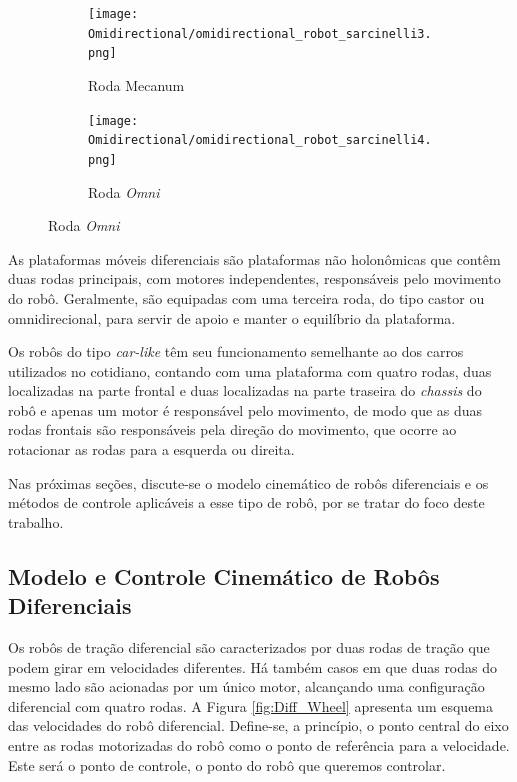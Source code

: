 \begin{figure}[htb]
    \caption{Rodas de Robôs Omnidirecionais}
    \centering    
    \begin{subfigure}[b]{0.2\textwidth}
        \texttt{[image: Omidirectional/omidirectional\_robot\_sarcinelli3.png]}
        \caption{Roda Mecanum}
    \end{subfigure}
    \hspace{0.1\textwidth}
    \begin{subfigure}[b]{0.2\textwidth}
        \texttt{[image: Omidirectional/omidirectional\_robot\_sarcinelli4.png]}
        \caption{Roda \textit{Omni}}
    \end{subfigure}
    \label{fig:rodas_omnidirecionais}
\end{figure}


As plataformas móveis diferenciais são plataformas não holonômicas que contêm duas rodas principais, com motores independentes, responsáveis pelo movimento do robô. Geralmente, são equipadas com uma terceira roda, do tipo castor ou omnidirecional, para servir de apoio e manter o equilíbrio da plataforma.

Os robôs do tipo \textit{car-like} têm seu funcionamento semelhante ao dos carros utilizados no cotidiano, contando com uma plataforma com quatro rodas, duas localizadas na parte frontal e duas localizadas na parte traseira do \textit{chassis} do robô e apenas um motor é responsável pelo movimento, de modo que as duas rodas frontais são responsáveis pela direção do movimento, que ocorre ao rotacionar as rodas para a esquerda ou direita.

Nas próximas seções, discute-se o modelo cinemático de robôs diferenciais e os métodos de controle aplicáveis a esse tipo de robô, por se tratar do foco deste trabalho.


    \subsection{Modelo e Controle Cinemático de Robôs Diferenciais}
    \label{sec:Modelo_Robos_Diferenciais}
    
    Os robôs de tração diferencial são caracterizados por duas rodas de tração que podem girar em velocidades diferentes. Há também casos em que duas rodas do mesmo lado são acionadas por um único motor, alcançando uma configuração diferencial com quatro rodas. A Figura \ref{fig:Diff_Wheel} apresenta um esquema das velocidades do robô diferencial. Define-se, a princípio, o ponto central do eixo entre as rodas motorizadas do robô como o ponto de referência para a velocidade. Este será o ponto de controle, o ponto do robô que queremos controlar.

